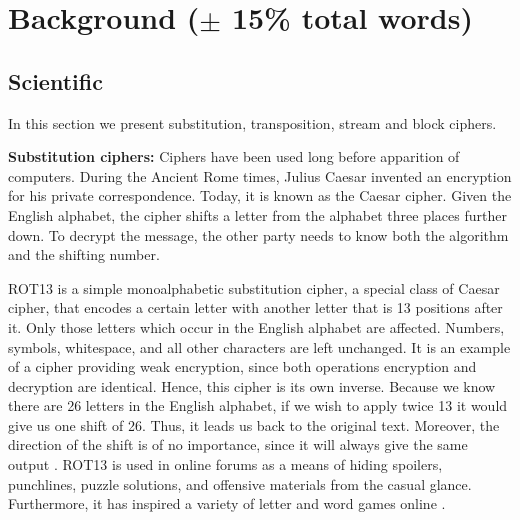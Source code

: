 \section{Background ($\pm$ 15\% total words)}
\subsection{Scientific}

In this section we present substitution, transposition, stream and block ciphers.

\textbf{Substitution ciphers:} 
Ciphers have been used long before apparition of computers. During the Ancient Rome times, Julius Caesar invented an encryption for his private correspondence. Today, it is known as the Caesar cipher. Given the English alphabet, the cipher shifts a letter from the alphabet three places further down. To decrypt the message, the other party needs to know both the algorithm and the shifting number. 

ROT13 is a simple monoalphabetic substitution cipher, a special class of Caesar cipher, that encodes a certain letter with another letter that is 13 positions after it. Only those letters which occur in the English alphabet are affected. Numbers, symbols, whitespace, and all other characters are left unchanged. It is an example of a cipher providing weak encryption, since both operations encryption and decryption are identical. Hence, this cipher is its own inverse. Because we know there are 26 letters in the English alphabet, if we wish to apply twice 13 it would give us one shift of 26. Thus, it leads us back to the original text. Moreover, the direction of the shift is of no importance, since it will always give the same output \cite{swenson2008modern}.
ROT13 is used in online forums as a means of hiding spoilers, punchlines, puzzle solutions, and offensive materials from the casual glance. Furthermore, it has inspired a variety of letter and word games online \cite{wikirot13}. 

